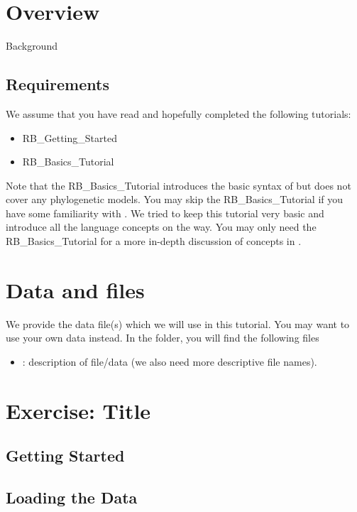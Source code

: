 \section{Overview}


Background

\subsection{Requirements}
We assume that you have read and hopefully completed the following tutorials:
\begin{itemize}
\item RB\_Getting\_Started
\item RB\_Basics\_Tutorial
\end{itemize}
Note that the RB\_Basics\_Tutorial introduces the basic syntax of \Rev but does not cover any phylogenetic models.
You may skip the RB\_Basics\_Tutorial if you have some familiarity with \R.
We tried to keep this tutorial very basic and introduce all the language concepts on the way.
You may only need the RB\_Basics\_Tutorial for a more in-depth discussion of concepts in \Rev.


\section{Data and files}

We provide the data file(s) which we will use in this tutorial.
You may want to use your own data instead.
In the  folder, you will find the following files
\begin{itemize}
\item
{}: description of file/data (we also need more descriptive file names).
\end{itemize}



\section{Exercise: Title}

\bigskip
\subsection{Getting Started}



\bigskip

\subsection{Loading the Data}

